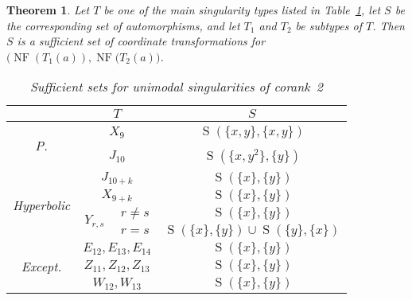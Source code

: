 \documentclass{amsproc}
\newtheorem{theorem}{Theorem}
\theoremstyle{definition}
\DeclareMathOperator{\NF}{NF}
\DeclareMathOperator{\s}{S}
\begin{document}
\begin{theorem}\label{thm:sufficient_sets}
Let $T$ be one of the main singularity types listed in
Table~\ref{tab:sufficient_sets}, let $S$ be the corresponding set of
automorphisms, and let $T_1$ and $T_2$ be subtypes of $T$. Then $S$ is a
sufficient set of coordinate transformations for
$\bigl(\NF(T_1(a)), \NF(T_2(a)\bigr)$.

\begin{table}[htb]
\centering
\caption{Sufficient sets for unimodal singularities of corank~2}
\label{tab:sufficient_sets}
\begin{tabular}{|c|c|c|c|}
\hline

& \multicolumn{2}{|c|}{$T$} & $S$ \\
\hline\hline


\multirow{2}{*}{\begin{sideways}P.\end{sideways}}

& \multicolumn{2}{|c|}{$X_9$}    & $\s(\{x, y\}, \{x, y\})$ \\ \cline{2-4}
& \multicolumn{2}{|c|}{$J_{10}$} & $\s(\{x, y^2\}, \{y\})$  \\ \hline


\multirow{4}{*}{\begin{sideways}Hyperbolic\end{sideways}}

& \multicolumn{2}{|c|}{$J_{10+k}$} & $\s(\{x\}, \{y\})$ \\ \cline{2-4}
& \multicolumn{2}{|c|}{$X_{9+k}$}  & $\s(\{x\}, \{y\})$ \\ \cline{2-4}

& \multirow{2}{*}{$Y_{r,s}$}
    & $r \neq s$ & $\s(\{x\}, \{y\})$                       \\ \cline{3-4}
&   & $r = s$    & $\s(\{x\}, \{y\}) \cup \s(\{y\}, \{x\})$ \\ \hline


\multirow{3}{*}{\begin{sideways}Except.\end{sideways}}

& \multicolumn{2}{|c|}{$E_{12}, E_{13}, E_{14}$} & $\s(\{x\}, \{y\})$
\\ \cline{2-4}
& \multicolumn{2}{|c|}{$Z_{11}, Z_{12}, Z_{13}$} & $\s(\{x\}, \{y\})$
\\ \cline{2-4}
& \multicolumn{2}{|c|}{$W_{12}, W_{13}$}         & $\s(\{x\}, \{y\})$
\\ \hline

\end{tabular}
\end{table}

\end{theorem}
\end{document}
